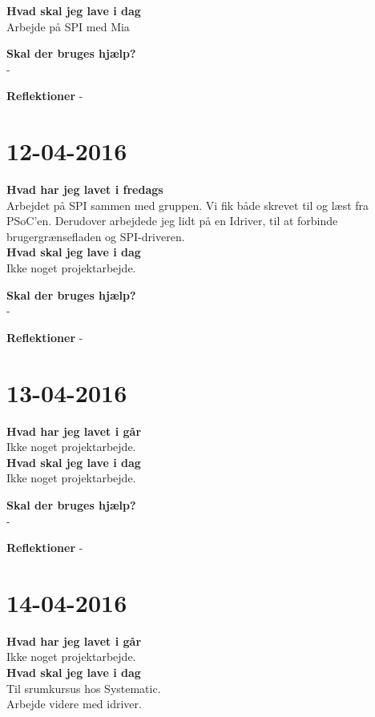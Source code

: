 \documentclass{article}
\begin{document}
	\textbf{Hvad skal jeg lave i dag}\\
	Arbejde på SPI med Mia
	
	\textbf{Skal der bruges hjælp?}\\
	-
	
	\textbf{Reflektioner}
	-
	
	

	\section{12-04-2016}
	
	\textbf{Hvad har jeg lavet i fredags}\\
	Arbejdet på SPI sammen med gruppen. Vi fik både skrevet til og læst fra PSoC'en. Derudover arbejdede jeg lidt på en Idriver, til at forbinde brugergrænsefladen og SPI-driveren.\\
	
	\textbf{Hvad skal jeg lave i dag}\\
	Ikke noget projektarbejde.
	
	\textbf{Skal der bruges hjælp?}\\
	-
	
	\textbf{Reflektioner}
	-
	
	
	
	\section{13-04-2016}
	
	\textbf{Hvad har jeg lavet i går}\\
	Ikke noget projektarbejde.\\
	
	\textbf{Hvad skal jeg lave i dag}\\
	Ikke noget projektarbejde.
	
	\textbf{Skal der bruges hjælp?}\\
	-
	
	\textbf{Reflektioner}
	-
	
	
	
	\section{14-04-2016}
	
	\textbf{Hvad har jeg lavet i går}\\
	Ikke noget projektarbejde.\\
	
	\textbf{Hvad skal jeg lave i dag}\\
	Til srumkursus hos Systematic.
	\\Arbejde videre med idriver.
	
\end{document}
